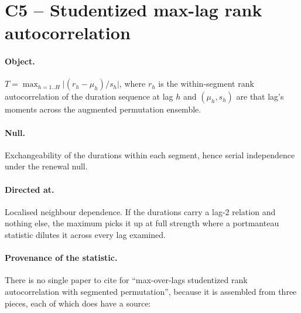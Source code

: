 \documentclass[11pt,a4paper]{article}
\begin{document}
\section{C5 -- Studentized max-lag rank autocorrelation}

\paragraph{Object.}
$T = \max_{h=1..H}\bigl| (r_h - \mu_h)/s_h \bigr|$, where $r_h$ is the within-segment
rank autocorrelation of the duration sequence at lag $h$ and $(\mu_h, s_h)$ are that
lag's moments across the augmented permutation ensemble.

\paragraph{Null.} Exchangeability of the durations within each segment, hence serial
independence under the renewal null.

\paragraph{Directed at.} Localised neighbour dependence. If the durations carry a lag-2
relation and nothing else, the maximum picks it up at full strength where a portmanteau
statistic dilutes it across every lag examined.

\paragraph{Provenance of the statistic.} There is no single paper to cite for
\enquote{max-over-lags studentized rank autocorrelation with segmented permutation},
because it is assembled from three pieces, each of which does have a source:
\end{document}
